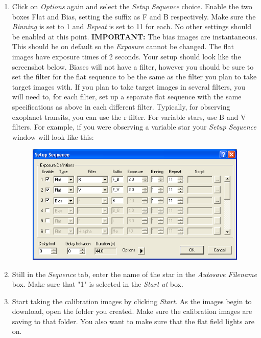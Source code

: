 \documentclass[11pt]{report}
\begin{document}
\begin{enumerate}
\item Click on \emph{Options} again and select the \emph{Setup Sequence} choice. Enable the two boxes Flat and Bias, setting the suffix as F and B respectively. Make sure the \emph{Binning} is set to 1 and \emph{Repeat} is set to 11 for each. No other settings should be enabled at this point. {\bf IMPORTANT:} The bias images are instantaneous. This should be on default so the \emph{Exposure} cannot be changed. The flat images have exposure times of 2 seconds. Your setup should look like the screenshot below. Biases will not have a filter, however you should be sure to set the filter for the flat sequence to be the same as the filter you plan to take target images with. If you plan to take target images in several filters, you will need to, for each filter, set up a separate flat sequence with the same specifications as above in each different filter. Typically, for observing exoplanet transits, you can use the r filter. For variable stars, use B and V filters. For example, if you were observing a variable star your \emph{Setup Sequence} window will look like this:

\begin{figure}[!h]
\begin{center}
\includegraphics[totalheight=.2\textheight]{Screenshot.png}
\end{center}
\end{figure}

\item Still in the \emph{Sequence} tab, enter the name of the star in the \emph{Autosave Filename} box. Make sure that "1" is selected in the \emph{Start at} box. 
\item Start taking the calibration images by clicking \emph{Start}. As the images begin to download, open the folder you created. Make sure the calibration images are saving to that folder. You also want to make sure that the flat field lights are on.
\end{enumerate}
\end{document}
